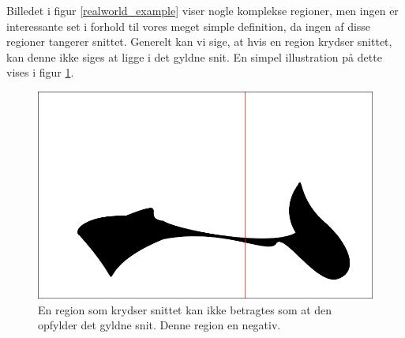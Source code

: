 {Billedet i figur \ref{realworld_example} viser nogle komplekse regioner,
men ingen er interessante set i forhold til vores meget simple
definition, da ingen af disse regioner tangerer snittet.  Generelt kan
vi sige, at hvis en region krydser snittet, kan denne ikke siges at ligge
i det gyldne snit. En simpel illustration på dette vises i figur
\ref{neg_naiv_1}.
\begin{figure}[p]
	\begin{center}
		\includegraphics[scale=\imgscale,angle=0]{afsnit/vores_implementation/billeder/naiv_algoritme/naiv_negativ_blob_2}
	\end{center}
	\caption[En negativt region]{En region som krydser snittet kan ikke
	betragtes som at den opfylder det gyldne snit. Denne region en
	negativ.}
	\label{neg_naiv_1}
\end{figure}

}
